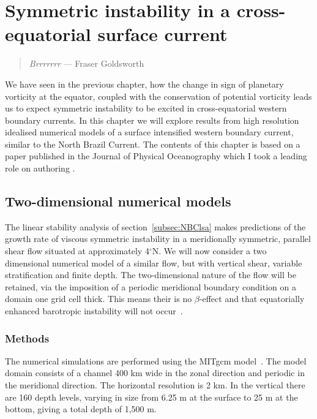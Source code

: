 \chapter{Symmetric instability in a cross-equatorial surface current}
\begin{quote}
    \textit{Brrrrrrr} --- Fraser Goldsworth
\end{quote}

We have seen in the previous chapter, how the change in sign of planetary vorticity at the equator, coupled with the conservation of potential vorticity leads us to expect symmetric instability to be excited in cross-equatorial western boundary currents. In this chapter we will explore results from high resolution idealised numerical models of a surface intensified western boundary current, similar to the North Brazil Current. The contents of this chapter is based on a paper published in the Journal of Physical Oceanography which I took a leading role on authoring \citep{Goldsworth2021a}.

\section{Two-dimensional numerical models}
The linear stability analysis of section~\ref{subsec:NBClsa} makes predictions of the growth rate of viscous symmetric instability in a meridionally symmetric, parallel shear flow situated at approximately 4$^\circ$N. We will now consider a two dimensional numerical model of a similar flow, but with vertical shear, variable stratification and finite depth. The two-dimensional nature of the flow will be retained, via the imposition of a periodic meridional boundary condition on a domain one grid cell thick. This means their is no $\beta$-effect and that equatorially enhanced barotropic instability will not occur~\citep{Edwards1998I,Edwards1998II}.

\subsection{Methods}
\label{subsec:2DMethods}
The numerical simulations are performed using the MITgcm model~\citep{Marshall1997}. The model domain consists of a channel 400 km wide in the zonal direction and periodic in the meridional direction. The horizontal resolution is 2 km. In the vertical there are 160 depth levels, varying in size from 6.25 m at the surface to 25 m at the bottom, giving a total depth of 1,500 m.

